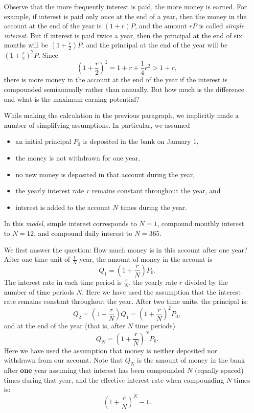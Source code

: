 Observe that the more frequently interest is paid, the more
money is earned. For example, if interest is paid only once at
the end of a year, then the money in the account at the end of
the year is $(1+r)P$, and the amount $rP$ is called {\em simple
interest\/}.  But if interest is paid twice a year, then the principal
at the end of six months will be $(1+\frac{r}{2})P$, and the principal
at the end of the year will be $(1+\frac{r}{2})^2P$.  Since
\[
\left(1+\frac{r}{2}\right)^2 = 1+r+\frac{1}{4}r^2 > 1+r,
\]
there is more money in the account at the end of the
year if the interest is compounded semiannually rather than
annually.  But how much is the difference and what is the
maximum earning potential?

While making the calculation in the previous paragraph, we
implicitly made a number of simplifying assumptions.  In
particular, we assumed
\begin{itemize}
\item	an initial principal $P_0$ is deposited in the bank on January 1,
\item	the money is not withdrawn for one year,
\item	no new money is deposited in that account during the year,
\item	the yearly interest rate $r$ remains constant throughout
	the year, and
\item	interest is added to the account $N$ times during the year.
\end{itemize}
In this {\em model\/}, simple interest corresponds to $N=1$, compound monthly
interest to $N=12$, and compound daily interest to $N=365$.

We first answer the question: How much money is in this account after
one year?  After one time unit of $\frac{1}{N}$ year, the amount of
money in the account is
\[
Q_1 = \left(1+\frac{r}{N}\right)P_0.
\]
The interest rate in each time period is $\frac{r}{N}$,
the yearly rate $r$ divided by the number of time periods $N$.  Here
we have used the assumption that the interest rate remains constant
throughout the year.  After two time units, the principal is:
\[
Q_2 = \left(1+\frac{r}{N}\right)Q_1 = \left(1+\frac{r}{N}\right)^2P_0,
\]
and at the end of the year (that is, after $N$ time periods)
\begin{equation} \label{compint}
Q_N = \left(1+\frac{r}{N}\right)^N P_0.
\end{equation}
Here we have used the assumption that money is neither deposited nor
withdrawn from our account.   Note that $Q_N$ is the amount of money
in the bank after {\bf one} year assuming that interest has been
compounded $N$ (equally spaced) times during that year, and the effective
interest rate when compounding $N$ times is:
\[
\left(1+\frac{r}{N}\right)^N - 1.
\]

